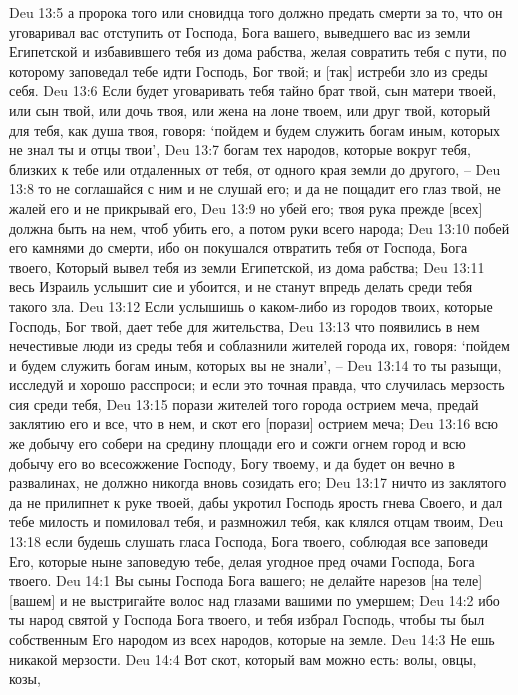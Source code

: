 Deu 13:5  а пророка того или сновидца того должно предать смерти за то, что он уговаривал вас отступить от Господа, Бога вашего, выведшего вас из земли Египетской и избавившего тебя из дома рабства, желая совратить тебя с пути, по которому заповедал тебе идти Господь, Бог твой; и [так] истреби зло из среды себя.
Deu 13:6  Если будет уговаривать тебя тайно брат твой, сын матери твоей, или сын твой, или дочь твоя, или жена на лоне твоем, или друг твой, который для тебя, как душа твоя, говоря: `пойдем и будем служить богам иным, которых не знал ты и отцы твои',
Deu 13:7  богам тех народов, которые вокруг тебя, близких к тебе или отдаленных от тебя, от одного края земли до другого, --
Deu 13:8  то не соглашайся с ним и не слушай его; и да не пощадит его глаз твой, не жалей его и не прикрывай его,
Deu 13:9  но убей его; твоя рука прежде [всех] должна быть на нем, чтоб убить его, а потом руки всего народа;
Deu 13:10  побей его камнями до смерти, ибо он покушался отвратить тебя от Господа, Бога твоего, Который вывел тебя из земли Египетской, из дома рабства;
Deu 13:11  весь Израиль услышит сие и убоится, и не станут впредь делать среди тебя такого зла.
Deu 13:12  Если услышишь о каком-либо из городов твоих, которые Господь, Бог твой, дает тебе для жительства,
Deu 13:13  что появились в нем нечестивые люди из среды тебя и соблазнили жителей города их, говоря: `пойдем и будем служить богам иным, которых вы не знали', --
Deu 13:14  то ты разыщи, исследуй и хорошо расспроси; и если это точная правда, что случилась мерзость сия среди тебя,
Deu 13:15  порази жителей того города острием меча, предай заклятию его и все, что в нем, и скот его [порази] острием меча;
Deu 13:16  всю же добычу его собери на средину площади его и сожги огнем город и всю добычу его во всесожжение Господу, Богу твоему, и да будет он вечно в развалинах, не должно никогда вновь созидать его;
Deu 13:17  ничто из заклятого да не прилипнет к руке твоей, дабы укротил Господь ярость гнева Своего, и дал тебе милость и помиловал тебя, и размножил тебя, как клялся отцам твоим,
Deu 13:18  если будешь слушать гласа Господа, Бога твоего, соблюдая все заповеди Его, которые ныне заповедую тебе, делая угодное пред очами Господа, Бога твоего.
Deu 14:1  Вы сыны Господа Бога вашего; не делайте нарезов [на теле] [вашем] и не выстригайте волос над глазами вашими по умершем;
Deu 14:2  ибо ты народ святой у Господа Бога твоего, и тебя избрал Господь, чтобы ты был собственным Его народом из всех народов, которые на земле.
Deu 14:3  Не ешь никакой мерзости.
Deu 14:4  Вот скот, который вам можно есть: волы, овцы, козы,
